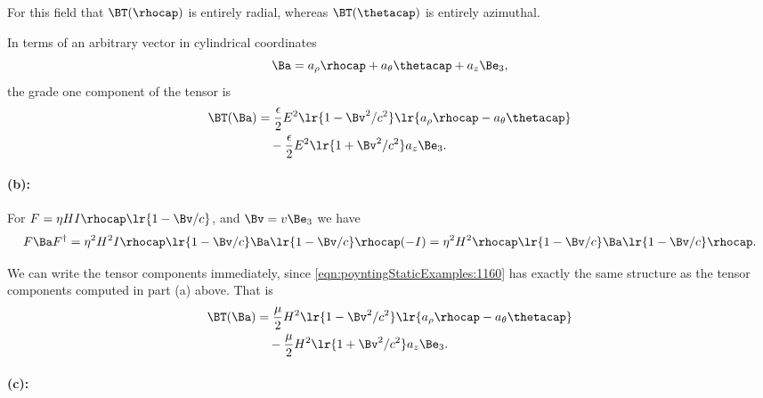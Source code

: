 For this field that \( \BT(\rhocap) \) is entirely radial, whereas \( \BT(\thetacap) \) is entirely azimuthal.

In terms of an arbitrary vector in cylindrical coordinates
\begin{equation}\label{eqn:poyntingStaticExamples:1200}
\Ba = a_\rho \rhocap + a_\theta \thetacap + a_z \Be_3,
\end{equation}
the grade one component of the tensor is
\begin{equation}\label{eqn:poyntingStaticExamples:1140}
\begin{aligned}
\BT(\Ba) &=
\frac{\epsilon}{2} E^2 \lr{1 -\Bv^2/c^2} \lr{ a_\rho \rhocap - a_\theta \thetacap } \\
&\quad -\frac{\epsilon}{2} E^2 \lr{1 +\Bv^2/c^2} a_z \Be_3.
\end{aligned}
\end{equation}

\paragraph{(b):}

For \( F = \eta H I \rhocap \lr{ 1 - \Bv/c } \), and \( \Bv = v \Be_3 \) we have
\begin{dmath}\label{eqn:poyntingStaticExamples:1160}
F \Ba F^\dagger
=
\eta^2 H^2 I \rhocap \lr{ 1 - \Bv/c } \Ba \lr{ 1 - \Bv/c } \rhocap (-I)
=
\eta^2 H^2 \rhocap \lr{ 1 - \Bv/c } \Ba \lr{ 1 - \Bv/c } \rhocap.
\end{dmath}

We can write the tensor components immediately, since
\cref{eqn:poyntingStaticExamples:1160}
has exactly the same structure as the tensor components computed in part (a) above.  That is
\begin{equation}\label{eqn:poyntingStaticExamples:1180}
\begin{aligned}
\BT(\Ba) &=
\frac{\mu}{2} H^2 \lr{1 -\Bv^2/c^2} \lr{ a_\rho \rhocap - a_\theta \thetacap } \\
&\quad -\frac{\mu}{2} H^2 \lr{1 +\Bv^2/c^2} a_z \Be_3.
\end{aligned}
\end{equation}

\paragraph{(c):}

